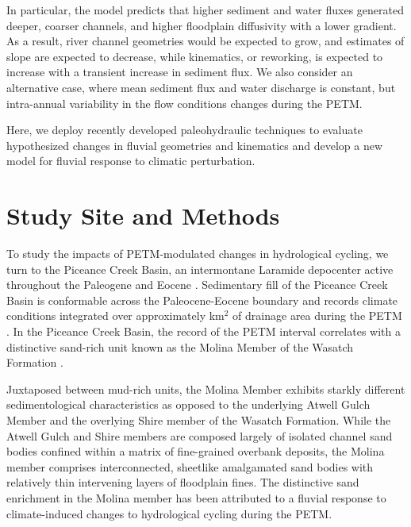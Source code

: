 \documentclass[draft]{compact_proposal}
\newcommand{\del}[3]{\ce{\delta^#1#2_{#3}}}
\begin{document}
In particular, the \cnote[BZF] model predicts that higher sediment and water fluxes generated deeper, coarser channels, and higher floodplain diffusivity with a lower gradient.
As a result, river channel geometries would be expected to grow, and estimates of slope are expected to decrease, while kinematics, or reworking, is expected to increase with a transient increase in sediment flux.
We also consider an alternative case, where mean sediment flux and water discharge is constant, but intra-annual variability in the flow conditions changes during the PETM.

Here, we deploy recently developed paleohydraulic techniques to evaluate hypothesized changes in fluvial geometries and kinematics and develop a new model for fluvial response to climatic perturbation.

\section{Study Site and Methods}


To study the impacts of PETM-modulated changes in hydrological cycling, we turn to the Piceance Creek Basin, an intermontane Laramide depocenter active throughout the Paleogene and Eocene \cnote.
Sedimentary fill of the Piceance Creek Basin is conformable across the Paleocene-Eocene boundary and records climate conditions integrated over approximately  km$^2$ of drainage area during the PETM \cnote.
In the Piceance Creek Basin, the \del{13}{C}{org} record of the PETM interval correlates with a distinctive sand-rich unit known as the Molina Member of the Wasatch Formation \cnote[bzf].

Juxtaposed between mud-rich units, the Molina Member exhibits starkly different sedimentological characteristics as opposed to the underlying Atwell Gulch Member and the overlying Shire member of the Wasatch Formation.
While the Atwell Gulch and Shire members are composed largely of isolated channel sand bodies confined within a matrix of fine-grained overbank deposits, the Molina member comprises interconnected, sheetlike amalgamated sand bodies with relatively thin intervening layers of floodplain fines.
The distinctive sand enrichment in the Molina member has been attributed to a fluvial response to climate-induced changes to hydrological cycling during the PETM.
\end{document}
